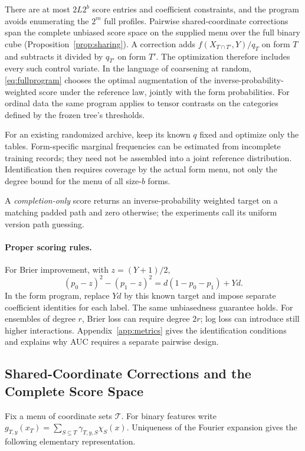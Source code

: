 There are at most $2L2^b$ score entries and coefficient constraints, and the program avoids enumerating the $2^m$ full profiles. Pairwise shared-coordinate corrections span the complete unbiased score space on the supplied menu over the full binary cube (Proposition~\ref{prop:sharing}). A correction adds $f(X_{T\cap T'},Y)/q_T$ on form $T$ and subtracts it divided by $q_{T'}$ on form $T'$. The optimization therefore includes every such control variate. In the language of coarsening at random, \eqref{eq:fullprogram} chooses the optimal augmentation of the inverse-probability-weighted score under the reference law, jointly with the form probabilities. For ordinal data the same program applies to tensor contrasts on the categories defined by the frozen tree's thresholds.

For an existing randomized archive, keep its known $q$ fixed and optimize only the tables. Form-specific marginal frequencies can be estimated from incomplete training records; they need not be assembled into a joint reference distribution. Identification then requires coverage by the actual form menu, not only the degree bound for the menu of all size-$b$ forms.

A \emph{completion-only} score returns an inverse-probability weighted target on a matching padded path and zero otherwise; the experiments call its uniform version path guessing.

\paragraph{Proper scoring rules.}
For Brier improvement, with $z=(Y+1)/2$,
\[
 (p_0-z)^2-(p_1-z)^2=d(1-p_0-p_1)+Yd.
\]
In the form program, replace $Yd$ by this known target and impose separate coefficient identities for each label. The same unbiasedness guarantee holds. For ensembles of degree $r$, Brier loss can require degree $2r$; log loss can introduce still higher interactions. Appendix~\ref{app:metrics} gives the identification conditions and explains why AUC requires a separate pairwise design.


\subsection{Shared-Coordinate Corrections and the Complete Score Space}\label{app:fullscores}
Fix a menu of coordinate sets $\mathcal T$. For binary features write
$g_{T,y}(x_T)=\sum_{S\subseteq T}\gamma_{T,y,S}\chi_S(x)$.
Uniqueness of the Fourier expansion gives the following elementary
representation.

